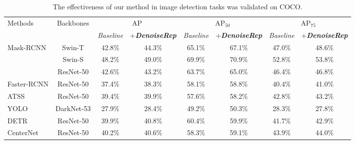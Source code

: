 \documentclass[conference]{IEEEtran}
\begin{document}
{\begin{table}[htbp]
\centering
\caption{The effectiveness of our method in image detection tasks was validated on COCO.}
\label{tab:image_detection_tasks}
\vspace{0.2cm}
\renewcommand{\arraystretch}{1.2} %
\begin{tabular}{l|c|cc|cc|cc}
\hline \hline
\multirow{2}{*}{Methods} & \multirow{2}{*}{Backbones} & \multicolumn{2}{c|}{AP} & \multicolumn{2}{c|}{AP$_{50}$} & \multicolumn{2}{c}{AP$_{75}$} \\ 
\cmidrule(lr){3-8}
 & & \textit{Baseline} & +\textit{\textbf{DenoiseRep}} & \textit{Baseline} & +\textit{\textbf{DenoiseRep}} & \textit{Baseline} & +\textit{\textbf{DenoiseRep}} \\ 
\midrule
\multirow{3}{*}{Mask-RCNN} & Swin-T     & 42.8\% & 44.3\% & 65.1\% & 67.1\% & 47.0\% & 48.6\% \\ 
 & Swin-S     & 48.2\% & 49.0\% & 69.9\% & 70.9\% & 52.8\% & 53.8\% \\ 
 & ResNet-50  & 42.6\% & 43.2\% & 63.7\% & 65.0\% & 46.4\% & 46.8\% \\ 
\midrule
Faster-RCNN & ResNet-50 & 37.4\% & 38.3\% & 58.1\% & 58.8\% & 40.4\% & 41.0\% \\ 
\midrule
ATSS        & ResNet-50 & 39.4\% & 39.9\% & 57.6\% & 58.2\% & 42.8\% & 43.2\% \\ 
\midrule
YOLO        & DarkNet-53 & 27.9\% & 28.4\% & 49.2\% & 50.3\% & 28.3\% & 27.8\% \\ 
\midrule
DETR        & ResNet-50 & 39.9\% & 40.8\% & 60.4\% & 59.9\% & 41.7\% & 42.9\% \\ 
\midrule
CenterNet   & ResNet-50 & 40.2\% & 40.6\% & 58.3\% & 59.1\% & 43.9\% & 44.0\% \\ 
\hline \hline
\end{tabular}
\end{table}


}
\end{document}
